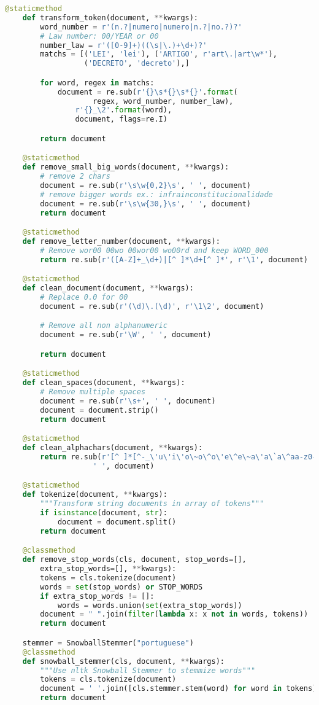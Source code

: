 \begin{apendicesenv}
\begin{lstlisting}[language=Python,extendedchars=true]
    @staticmethod
    def transform_token(document, **kwargs):
        word_number = r'(n.?|numero|numero|n.?|no.?)?'
        # Law number: 00/YEAR or 00
        number_law = r'([0-9]+)((\s|\.)+\d+)?'
        matchs = [('LEI', 'lei'), ('ARTIGO', r'art\.|art\w*'),
                  ('DECRETO', 'decreto'),]

        for word, regex in matchs:
            document = re.sub(r'{}\s*{}\s*{}'.format(
                    regex, word_number, number_law),
                r'{}_\2'.format(word),
                document, flags=re.I)

        return document

    @staticmethod
    def remove_small_big_words(document, **kwargs):
        # remove 2 chars
        document = re.sub(r'\s\w{0,2}\s', ' ', document)
        # remove bigger words ex.: infrainconstitucionalidade
        document = re.sub(r'\s\w{30,}\s', ' ', document)
        return document

    @staticmethod
    def remove_letter_number(document, **kwargs):
        # Remove wor00 00wo 00wor00 wo00rd and keep WORD_000
        return re.sub(r'([A-Z]+_\d+)|[^ ]*\d+[^ ]*', r'\1', document)

    @staticmethod
    def clean_document(document, **kwargs):
        # Replace 0.0 for 00
        document = re.sub(r'(\d)\.(\d)', r'\1\2', document)

        # Remove all non alphanumeric
        document = re.sub(r'\W', ' ', document)

        return document

    @staticmethod
    def clean_spaces(document, **kwargs):
        # Remove multiple spaces
        document = re.sub(r'\s+', ' ', document)
        document = document.strip()
        return document

    @staticmethod
    def clean_alphachars(document, **kwargs):
        return re.sub(r'[^ ]*[^-_\'u\'i\'o\~o\^o\'e\^e\~a\'a\`a\^aa-z0-9\{\c c} ]+[^ ]*',
                    ' ', document)

    @staticmethod
    def tokenize(document, **kwargs):
        """Transform string documents in array of tokens"""
        if isinstance(document, str):
            document = document.split()
        return document

    @classmethod
    def remove_stop_words(cls, document, stop_words=[],
        extra_stop_words=[], **kwargs):
        tokens = cls.tokenize(document)
        words = set(stop_words) or STOP_WORDS
        if extra_stop_words != []:
            words = words.union(set(extra_stop_words))
        document = " ".join(filter(lambda x: x not in words, tokens))
        return document

    stemmer = SnowballStemmer("portuguese")
    @classmethod
    def snowball_stemmer(cls, document, **kwargs):
        """Use nltk Snowball Stemmer to stemmize words"""
        tokens = cls.tokenize(document)
        document = ' '.join([cls.stemmer.stem(word) for word in tokens])
        return document
\end{lstlisting}

\end{apendicesenv}